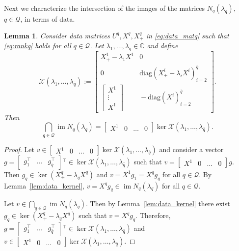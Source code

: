 \documentclass[11pt]{article}
\theoremstyle{plain}
\newtheorem{lemma}[theorem]{Lemma}
\theoremstyle{definition}
\theoremstyle{remark}
\begin{document}
Next we characterize the intersection of the images of the matrices $N_q(\lambda_q)$, $q\in\mathcal Q$, in terms of data.
\begin{lemma}
    Consider data matrices $U^q, X^q, X_+^q$ in \eqref{eq:data_matq} such that \eqref{eq:rankq} holds for all $q\in\mathcal Q$. Let $\lambda_1,\dots, \lambda_{\bar q}\in\mathbb C$ and define
\begin{equation}
\label{eq:curlyX}
\!\!\!    \mathcal X(\lambda_1,\dots, \lambda_{\bar q}) \!:=\!
    \begin{bmatrix}
        X_+^1 \!- \!\lambda_1 X^1 & 0 \\
        0&\!\!\!\!\! \mathrm{diag}(X_+^i \!- \!\lambda_i X^i)_{i=2}^{\bar q}\\
        \begin{bmatrix}
            X^1\\ \vdots \\ X^1
        \end{bmatrix} &\!\!\!\!\! - \mathrm{diag}(X^i)_{i=2}^{\bar q}
    \end{bmatrix}\!.
\end{equation}
Then
\begin{equation}
    \bigcap_{q\in\mathcal Q} \operatorname{im}N_q(\lambda_q) = \begin{bmatrix} X^1 &\!\! 0 &\!\! \dots &\!\! 0\end{bmatrix} \operatorname{ker}\mathcal X(\lambda_1,\dots, \lambda_{\bar q}).
\end{equation}
\end{lemma}
\begin{proof}
    Let $v\in \begin{bmatrix}
        X^1 & 0 &\dots & 0
    \end{bmatrix} \ker \mathcal X(\lambda_1,\dots, \lambda_{\bar q})$ and consider a vector $g = \begin{bmatrix}
        g_{1}^\top & \dots & g_{\bar q}^\top
    \end{bmatrix}{}^\top\in \ker \mathcal X(\lambda_1,\dots, \lambda_{\bar q})$ such that $v = \begin{bmatrix}
        X^1 & 0 &\dots & 0
    \end{bmatrix} g$. Then $g_q\in \ker(X_+^q-\lambda_q X^q)$ and $v = X^1 g_1 = X^q g_q$ for all $q\in\mathcal Q$. By Lemma~\ref{lem:data_kernel}, $v = X^q g_q \in \operatorname{im} N_q(\lambda_q)$ for all $q\in\mathcal Q$.

    Let $v\in \bigcap_{q\in\mathcal Q} \operatorname{im}N_q(\lambda_q)$. Then by Lemma~\ref{lem:data_kernel} there exist $g_q\in \ker(X_+^q-\lambda_q X^q)$ such that $v = X^q g_q$. Therefore, $g = \begin{bmatrix}
        g_{1}^\top & \dots & g_{\bar q}^\top
    \end{bmatrix}{}^\top\in \ker \mathcal X(\lambda_1,\dots, \lambda_{\bar q})$ and $v\in \begin{bmatrix}
        X^1 & 0 &\dots & 0
    \end{bmatrix} \ker \mathcal X(\lambda_1,\dots, \lambda_{\bar q})$.
\end{proof}
\end{document}
